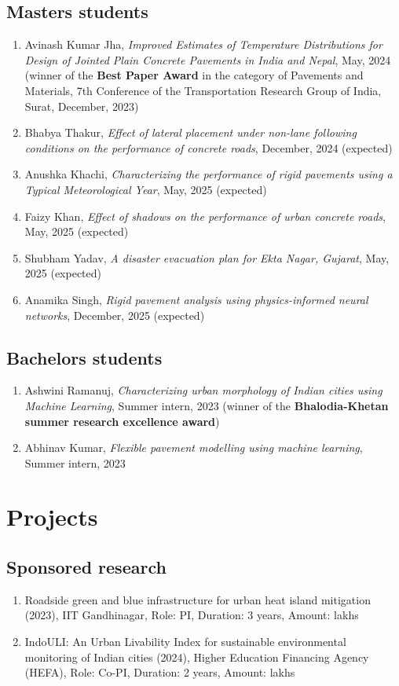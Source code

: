 \documentclass[12pt]{article}
\begin{document}
\subsection*{Masters students}
\begin{enumerate}
	\item Avinash Kumar Jha, \textit{Improved Estimates of Temperature Distributions for Design of Jointed Plain Concrete Pavements in India and Nepal}, May, 2024 (winner of the \textbf{Best Paper Award} in the category of Pavements and Materials, 7th Conference of the Transportation Research Group of India, Surat, December, 2023)
	\item Bhabya Thakur, \textit{Effect of lateral placement under non-lane following conditions on the performance of concrete roads}, December, 2024 (expected)
	\item Anushka Khachi, \textit{Characterizing the performance of rigid pavements using a Typical Meteorological Year}, May, 2025 (expected)
	\item Faizy Khan, \textit{Effect of shadows on the performance of urban concrete roads}, May, 2025 (expected)
	\item Shubham Yadav, \textit{A disaster evacuation plan for Ekta Nagar, Gujarat}, May, 2025 (expected)
	\item Anamika Singh, \textit{Rigid pavement analysis using physics-informed neural networks}, December, 2025 (expected)
\end{enumerate}

\hfill
\subsection*{Bachelors students}
\begin{enumerate}
	\item Ashwini Ramanuj,  \textit{Characterizing urban morphology of Indian cities using Machine Learning}, Summer intern, 2023 (winner of the \textbf{Bhalodia-Khetan summer research excellence award})
	\item Abhinav Kumar, \textit{Flexible pavement modelling using machine learning}, Summer intern, 2023 
\end{enumerate}

\bigskip
\section*{Projects}
\hfill
\subsection*{Sponsored research}
\begin{enumerate}
	\item Roadside green and blue infrastructure for urban heat island mitigation (2023), IIT Gandhinagar, Role: PI, Duration: 3 years, Amount:  lakhs
	\item IndoULI: An Urban Livability Index for sustainable environmental monitoring of Indian cities (2024), Higher Education Financing Agency (HEFA), Role: Co-PI, Duration: 2 years, Amount:  lakhs
\end{enumerate}
\end{document}
